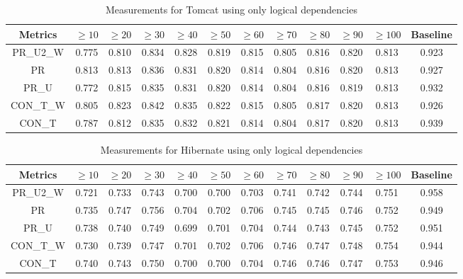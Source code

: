 \documentclass[runningheads]{comsis2}
\begin{document}
\begin{table}[!h]
\setlength\tabcolsep{3.5pt}
\caption{Measurements for Tomcat using only logical dependencies}
\label{tab:measurementshistory:tomcat}
\centering
\begin{tabular}{|c|cccccccccc|c|}
\hline
Metrics &	$\geq10$	&	$\geq20$		&	$\geq30$		&	$\geq40$		&	$\geq50$		&	$\geq60$		&	$\geq70$		&	$\geq80$		&	$\geq90$		&	$\geq100$		&	Baseline \\
\hline

PR\_U2\_W	&	0.775	&	0.810	&	0.834	&	0.828	&	0.819	&	0.815	&	0.805	&	0.816	&	0.820	&	0.813	&	0.923	\\
PR	&	0.813	&	0.813	&	0.836	&	0.831	&	0.820	&	0.814	&	0.804	&	0.816	&	0.820	&	0.813	&	0.927	\\
PR\_U	&	0.772	&	0.815	&	0.835	&	0.831	&	0.820	&	0.814	&	0.804	&	0.816	&	0.819	&	0.813	&	0.932	\\
CON\_T\_W	&	0.805	&	0.823	&	0.842	&	0.835	&	0.822	&	0.815	&	0.805	&	0.817	&	0.820	&	0.813	&	0.926	\\
CON\_T	&	0.787	&	0.812	&	0.835	&	0.832	&	0.821	&	0.814	&	0.804	&	0.817	&	0.820	&	0.813	&	0.939	\\

				
\hline
\end{tabular}

\end{table}


\begin{table}[!h]
\setlength\tabcolsep{3.5pt}
\caption{Measurements for Hibernate using only logical dependencies}
\label{tab:measurementshistory:hibernate}
\centering
\begin{tabular}{|c|cccccccccc|c|}
\hline
Metrics &	$\geq10$	&	$\geq20$		&	$\geq30$		&	$\geq40$		&	$\geq50$		&	$\geq60$		&	$\geq70$		&	$\geq80$		&	$\geq90$		&	$\geq100$		&	Baseline \\
\hline

PR\_U2\_W	&	0.721	&	0.733	&	0.743	&	0.700	&	0.700	&	0.703	&	0.741	&	0.742	&	0.744	&	0.751	&	0.958	\\
PR	&	0.735	&	0.747	&	0.756	&	0.704	&	0.702	&	0.706	&	0.745	&	0.745	&	0.746	&	0.752	&	0.949	\\
PR\_U	&	0.738	&	0.740	&	0.749	&	0.699	&	0.701	&	0.704	&	0.744	&	0.743	&	0.745	&	0.752	&	0.951	\\
CON\_T\_W	&	0.730	&	0.739	&	0.747	&	0.701	&	0.702	&	0.706	&	0.746	&	0.747	&	0.748	&	0.754	&	0.944	\\
CON\_T	&	0.740	&	0.743	&	0.750	&	0.700	&	0.700	&	0.704	&	0.746	&	0.746	&	0.747	&	0.753	&	0.946	\\


\hline
\end{tabular}
\end{table}
\end{document}
